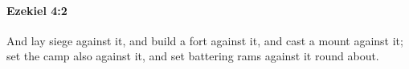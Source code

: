 
		\paragraph{Ezekiel 4:2} %
			\label{EZEKIEL-4-2}

			And lay siege against it, and build a fort against it, and cast a mount against it; set the camp also against it, and set battering rams against it round about.


